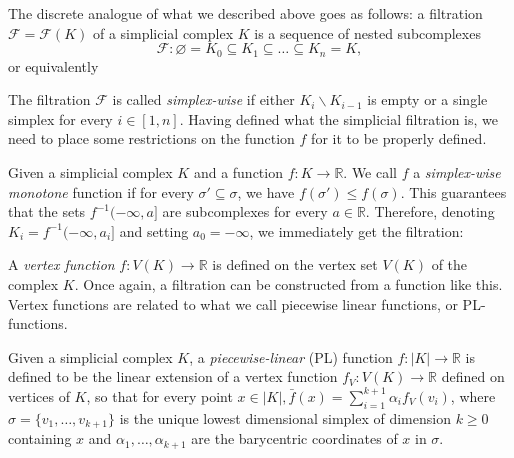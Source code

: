   The discrete analogue of what we described above goes as follows: a filtration $\mathcal{F} = \mathcal{F}(K)$ of a simplicial complex $K$ is a sequence of nested subcomplexes
  \begin{equation*}
    \mathcal{F} : \varnothing = K_{0} \subseteq K_{1} \subseteq \ldots \subseteq K_{n} = K,
  \end{equation*}
  or equivalently

  \begin{figure}[h!]
    \centering
  \end{figure}

  The filtration $\mathcal{F}$ is called \textit{simplex-wise} if either $K_{i} \backslash K_{i-1}$ is empty or a single simplex for every $i \in [1,n]$. Having defined what the simplicial filtration is, we need to place some restrictions on the function $f$ for it to be properly defined.

  \par
  Given a simplicial complex $K$ and a function $f: K \to \mathbb{R}$. We call $f$ a \textit{simplex-wise monotone} function if for every $\sigma' \subseteq \sigma$, we have $f(\sigma') \leq f(\sigma)$. This guarantees that the sets $f^{-1}(-\infty, a]$ are subcomplexes for every $a \in \mathbb{R}$. Therefore, denoting $K_{i} = f^{-1}(-\infty, a_{i}]$ and setting $a_{0} = -\infty$, we immediately get the filtration:

      \begin{figure}[h!]
        \centering
      \end{figure}

      A \textit{vertex function} $f:V(K) \to \mathbb{R}$ is defined on the vertex set $V(K)$ of the complex $K$. Once again, a filtration can be constructed from a function like this. Vertex functions are related to what we call piecewise linear functions, or PL-functions.

      \begin{definition}[PL-functions]
        Given a simplicial complex $K$, a \textit{piecewise-linear} (PL) function $f: |K| \to \mathbb{R}$ is defined to be the linear extension of a vertex function $f_{V}: V(K) \to \mathbb{R}$ defined on vertices of $K$, so that for every point $x \in |K|, \bar{f}(x) = \sum_{i=1}^{k+1}\alpha_{i}f_{V}(v_{i})$, where $\sigma = \{v_{1}, \ldots, v_{k+1}\}$ is the unique lowest dimensional simplex of dimension $k\geq 0$ containing $x$ and $\alpha_{1}, \ldots, \alpha_{k+1}$ are the barycentric coordinates of $x$ in $\sigma$.
      \end{definition}

